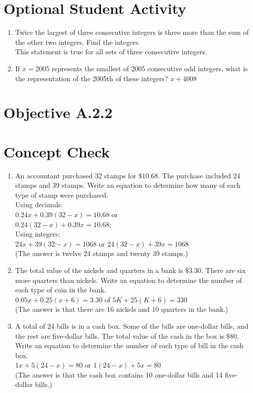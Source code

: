 \documentclass{ximera}
\begin{document}
\section*{Optional Student Activity}
\begin{enumerate}
  \item Twice the largest of three consecutive integers is three more than the sum of the other two integers. Find the integers.\\
This statement is true for all sets of three consecutive integers.
  \item If $x=2005$ represents the smallest of 2005 consecutive odd integers, what is the representation of the 2005th of these integers? $x+4008$
\end{enumerate}

\section*{Objective A.2.2}
\section*{Concept Check}
\begin{enumerate}
  \item An accountant purchased 32 stamps for $\$ 10.68$. The purchase included 24\textcent{} stamps and 39\textcent{} stamps. Write an equation to determine how many of each type of stamp were purchased.\\
Using decimals:\\
$0.24 x+0.39(32-x)=10.68$ or\\
$0.24(32-x)+0.39 x=10.68$;\\
Using integers:\\
$24 x+39(32-x)=1068$ or $24(32-x)+39 x=1068$\\
(The answer is twelve 24\textcent{} stamps and twenty 39\textcent{} stamps.)
  \item The total value of the nickels and quarters in a bank is $\$ 3.30$. There are six more quarters than nickels. Write an equation to determine the number of each type of coin in the bank.\\
$0.05 x+0.25(x+6)=3.30$ of $5 K+25(K+6)=330$\\
(The answer is that there are 16 nickels and 10 quarters in the bank.)
  \item A total of 24 bills is in a cash box. Some of the bills are one-dollar bills, and the rest are five-dollar bills. The total value of the cash in the box is $\$ 80$. Write an equation to determine the number of each type of bill in the cash box.\\
$1 x+5(24-x)=80$ or $1(24-x)+5 x=80$\\
(The answer is that the cash box contains 10 one-dollar bills and 14 five-dollar bills.)
\end{enumerate}
\end{document}
